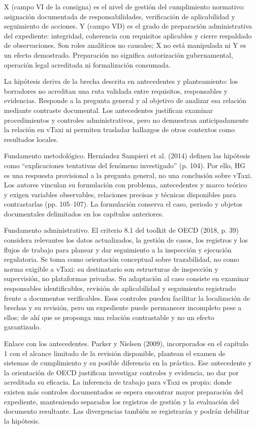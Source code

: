 {X (campo VI de la consigna) es el nivel de gestión del cumplimiento normativo: asignación documentada de responsabilidades, verificación de aplicabilidad y seguimiento de acciones. Y (campo VD) es el grado de preparación administrativa del expediente: integridad, coherencia con requisitos aplicables y cierre respaldado de observaciones. Son roles analíticos no causales; X no está manipulada ni Y es un efecto demostrado. Preparación no significa autorización gubernamental, operación legal acreditada ni formalización consumada.


La hipótesis deriva de la brecha descrita en antecedentes y planteamiento: los borradores no acreditan una ruta validada entre requisitos, responsables y evidencias. Responde a la pregunta general y al objetivo de analizar esa relación mediante contraste documental. Los antecedentes justifican examinar procedimientos y controles administrativos, pero no demuestran anticipadamente la relación en vTaxi ni permiten trasladar hallazgos de otros contextos como resultados locales.


Fundamento metodológico. Hernández Sampieri et al. (2014) definen las hipótesis como “explicaciones tentativas del fenómeno investigado” (p. 104). Por ello, HG es una respuesta provisional a la pregunta general, no una conclusión sobre vTaxi. Los autores vinculan su formulación con problema, antecedentes y marco teórico y exigen variables observables, relaciones precisas y técnicas disponibles para contrastarlas (pp. 105–107). La formulación conserva el caso, periodo y objetos documentales delimitados en los capítulos anteriores.


Fundamento administrativo. El criterio 8.1 del toolkit de OECD (2018, p. 39) considera relevantes los datos actualizados, la gestión de casos, los registros y los flujos de trabajo para planear y dar seguimiento a la inspección y ejecución regulatoria. Se toma como orientación conceptual sobre trazabilidad, no como norma exigible a vTaxi: su destinatario son estructuras de inspección y supervisión, no plataformas privadas. Su adaptación al caso consiste en examinar responsables identificables, revisión de aplicabilidad y seguimiento registrado frente a documentos verificables. Esos controles pueden facilitar la localización de brechas y su revisión, pero un expediente puede permanecer incompleto pese a ellos; de ahí que se proponga una relación contrastable y no un efecto garantizado.


Enlace con los antecedentes. Parker y Nielsen (2009), incorporados en el capítulo 1 con el alcance limitado de la revisión disponible, plantean el examen de sistemas de cumplimiento y su posible diferencia en la práctica. Ese antecedente y la orientación de OECD justifican investigar controles y evidencia, no dar por acreditada su eficacia. La inferencia de trabajo para vTaxi es propia: donde existen más controles documentados se espera encontrar mayor preparación del expediente, manteniendo separados los registros de gestión y la evaluación del documento resultante. Las divergencias también se registrarán y podrán debilitar la hipótesis.


}
